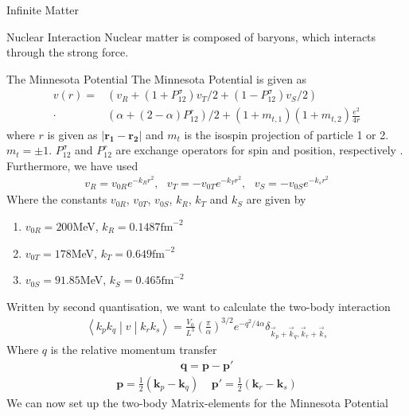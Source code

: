 \documentclass[twoside,english]{uiofysmaster}
\begin{document}
\begin{chapter}{Infinite Matter}
	\begin{section}{Nuclear Interaction}
		Nuclear matter is composed of baryons, which interacts through the strong force. 
		
		\begin{subsection}{The Minnesota Potential}
			The Minnesota Potential is given as
			\begin{align}
				v(r) = &\left(v_R + (1 + P_{12}^\sigma) v_T/2 + (1 - P_{12}^\sigma) v_S/2 \right) \\
					   \cdot &\left( \alpha + (2- \alpha)P_{12}^r \right)/2 + (1+m_{t,1})(1+m_{t,2})\frac{e^2}{4r}
			\end{align}
			where $r$ is given as $\left| \mathbf{r_1} - \mathbf{r_2} \right|$ and $m_t$ is the isospin projection of particle 1 or 2. $m_t = \pm 1$. 
			$P_{12}^\sigma $ and $P_{12}^r$ are exchange operators for spin and position, respectively \cite{Baardsen}. Furthermore, we have used
			\begin{align} 
				v_R = v_{0R}e^{-k_R r^2}, \:\:\: v_T = -v_{0T} e^{-k_Tr^2}, \:\:\: v_S = -v_{0S}e^{-k_sr^2}
			\end{align}
			Where the constants $v_{0R}$, $v_{0T}$, $v_{0S}$, $k_R$, $k_T$ and $k_S$ are given by \cite{Thompson1977}
			\begin{enumerate}
				\item $v_{0R} = 200$MeV,  $k_R = 0.1487 \text{fm}^{-2}$
				\item $v_{0T} = 178$MeV,  $k_T = 0.649 \text{fm}^{-2}$
				\item $v_{0S} = 91.85$MeV, $k_S = 0.465 \text{fm}^{-2}$
			\end{enumerate}
			Written by second quantisation, we want to calculate the two-body interaction
			\begin{align}
			 	\left<k_p k_q \middle| v \middle| k_r k_s \right> = \frac{V_0}{L^3} \left(\frac{\pi}{\alpha}\right)^{3/2} e^{-q^2 / 4 \alpha} \delta_{\vec k_p + \vec k_q, \vec k_r + \vec k_s}
			\end{align}
			Where $q$ is the relative momentum transfer
			\begin{align}
				\mathbf{q} = \mathbf{p} - \mathbf{p'} 
			\end{align}
			\begin{align}
				\mathbf{p} = \frac{1}{2} (\mathbf{k}_p - \mathbf{k}_q) \:\:\:\:\: \mathbf{p'} = \frac{1}{2}(\mathbf{k}_r- \mathbf{k}_s) 
			\end{align}
			We can now set up the two-body Matrix-elements for the Minnesota Potential
			\begin{align}

\end{align}
\end{subsection}
\end{section}
\end{chapter}
\end{document}
